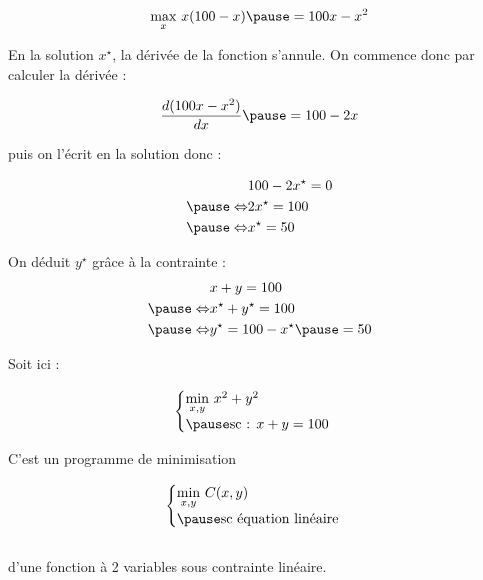 \documentclass[9pt,handout,professionalfonts,hyperref]{beamer}
\begin{document}
\begin{frame}
\[\begin{aligned}
\underset{x}{\max}~x(100-x) \pause = 100x-x^2
\end{aligned}\]

\pause En la solution $x^\star$, la dérivée de la fonction s'annule. On commence donc par calculer la dérivée :

\[\begin{aligned}
\frac{d(100x-x^2)}{dx} \pause = 100-2x
\end{aligned}\]

\pause puis on l'écrit en la solution donc :

\[\begin{aligned}
&100-2x^\star=0\\
\pause \Leftrightarrow&2x^\star=100\\
\pause \Leftrightarrow&x^\star=50\\
\end{aligned}\]

\pause On déduit $y^{\star}$ grâce à la contrainte :
\[\begin{aligned}
&x+y=100  \\
\pause \Leftrightarrow &x^\star+y^\star=100 \\
\pause \Leftrightarrow &y^\star=100-x^\star \pause = 50
\end{aligned}\]

\end{frame}

\begin{frame}

Soit ici : \newline

	\[\begin{aligned}
	\begin{cases}
	\underset{x,y}{\min}~x^2 + y^2 \\
	\pause \text{sc : } x + y =100
	\end{cases}
	\end{aligned}\]\newline


C'est un programme de minimisation

\[\begin{aligned}
\begin{cases}
\underset{x,y}{\min}~C(x,y) \\
\pause \text{sc équation linéaire}
\end{cases}
\end{aligned}\]\\

d'une fonction à 2 variables sous contrainte linéaire. \pause

\end{frame}
\end{document}
